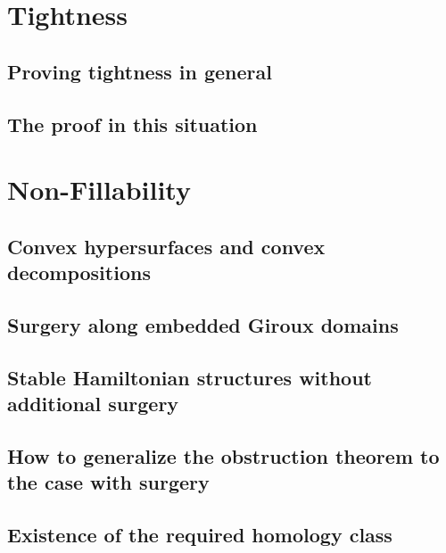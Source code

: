 \documentclass[oneside]{amsbook}
\begin{document}
\chapter{Tightness}

\section{Proving tightness in general}

\section{The proof in this situation}



\chapter{Non-Fillability}
\section{Convex hypersurfaces and convex decompositions}

\section{Surgery along embedded Giroux domains}

\section{Stable Hamiltonian structures without additional surgery}

\section{How to generalize the obstruction theorem to the case with surgery}
\section{Existence of the required homology class}


\newpage


\end{document}

